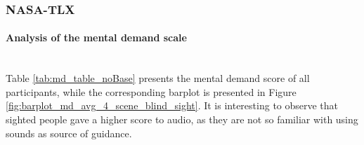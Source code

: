 \subsubsection{NASA-TLX}
\label{subsubsec:results_nasa_tlx_2}

\paragraph{Analysis of the mental demand scale}\mbox{}\\

Table \ref{tab:md_table_noBase} presents the mental demand score of all participants, while the corresponding barplot is presented in Figure \ref{fig:barplot_md_avg_4_scene_blind_sight}. It is interesting to observe that sighted people gave a higher score to audio, as they are not so familiar with using sounds as source of guidance.



